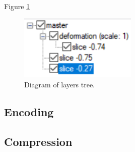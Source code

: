 
Figure \ref{fig:layers-tree}

\begin{figure}[H]
    \centering
    \includegraphics[width=0.5\textwidth]{figures/layers-tree-diagram}
    \decoRule
    \caption{Diagram of layers tree.}
    \label{fig:layers-tree}
\end{figure}






\subsection {Encoding}

\subsection {Compression}

